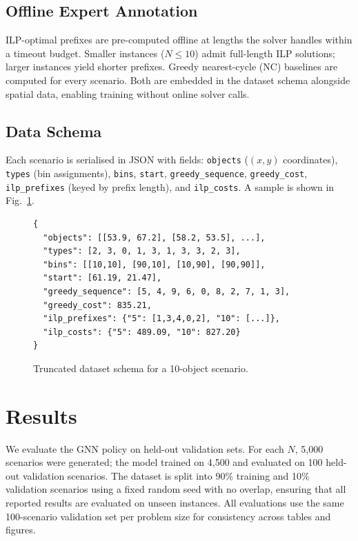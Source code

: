 \documentclass[conference]{IEEEtran}
\begin{document}
\subsection{Offline Expert Annotation}

ILP-optimal prefixes are pre-computed offline at lengths the solver handles within a timeout budget. Smaller instances ($N{\le}10$) admit full-length ILP solutions; larger instances yield shorter prefixes. Greedy nearest-cycle (NC) baselines are computed for every scenario. Both are embedded in the dataset schema alongside spatial data, enabling training without online solver calls.

\subsection{Data Schema}

Each scenario is serialised in JSON with fields: \texttt{objects} ($(x,y)$ coordinates), \texttt{types} (bin assignments), \texttt{bins}, \texttt{start}, \texttt{greedy\_sequence}, \texttt{greedy\_cost}, \texttt{ilp\_prefixes} (keyed by prefix length), and \texttt{ilp\_costs}. A sample is shown in Fig.~\ref{fig:json_sample}.

\begin{figure}[htbp]
\centering
\begin{scriptsize}
\begin{verbatim}
{
  "objects": [[53.9, 67.2], [58.2, 53.5], ...],
  "types": [2, 3, 0, 1, 3, 1, 3, 3, 2, 3],
  "bins": [[10,10], [90,10], [10,90], [90,90]],
  "start": [61.19, 21.47],
  "greedy_sequence": [5, 4, 9, 6, 0, 8, 2, 7, 1, 3],
  "greedy_cost": 835.21,
  "ilp_prefixes": {"5": [1,3,4,0,2], "10": [...]},
  "ilp_costs": {"5": 489.09, "10": 827.20}
}
\end{verbatim}
\end{scriptsize}
\caption{Truncated dataset schema for a 10-object scenario.}
\label{fig:json_sample}
\end{figure}

\section{Results}\label{sec:results}

We evaluate the GNN policy on held-out validation sets. For each $N$, 5{,}000 scenarios were generated; the model trained on 4{,}500 and evaluated on 100 held-out validation scenarios. The dataset is split into 90\% training and 10\% validation scenarios using a fixed random seed with no overlap, ensuring that all reported results are evaluated on unseen instances. All evaluations use the same 100-scenario validation set per problem size for consistency across tables and figures.
\end{document}
